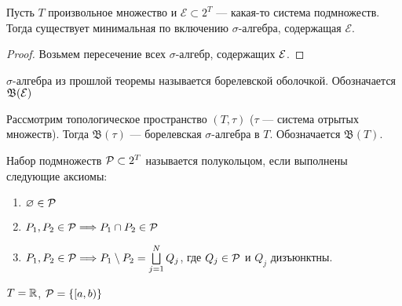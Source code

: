 \begin{thm}
	Пусть $ T$ произвольное множество и $ \mathcal{E} \subset 2^{T}$ --- какая-то система подмножеств. Тогда существует минимальная по включению $ \sigma $-алгебра, содержащая $ \mathcal{E}$.
\end{thm}
\begin{proof}
    Возьмем пересечение всех $\sigma$-алгебр, содержащих $\E$.
\end{proof}

\begin{defn}
	$\sigma$-алгебра из прошлой теоремы называется {\sf борелевской оболочкой}.  
		Обозначается $ \mathfrak{B}(\E)$
\end{defn}
\begin{defn}
	Рассмотрим топологическое пространство $ (T, \tau )$ ($ \tau $ --- система отрытых множеств). Тогда $ \mathfrak{B}(\tau )$ --- {\sf борелевская}  $\sigma$-алгебра в $ T$. Обозначается $ \mathfrak{B}(T)$.
\end{defn}

\begin{defn}[Полукольцо]
    Набор подмножеств $ \P \subset 2^{T}$ называется {\sf полукольцом}, если выполнены следующие аксиомы:
\begin{enumerate}[label=(\roman*),noitemsep]
    \item  $ \varnothing \in \P$
	\item $ P_1, P_2 \in \P \Longrightarrow  P_1 \cap P_2 \in \P$

	\item $ P_1, P_2 \in \P \Longrightarrow P_1 \setminus P_2 = \bigsqcup\limits_{j=1}^{N} Q_{j} $, где $ Q_j \in \P$ и $ Q_j$ дизъюнктны.
\end{enumerate} 
\end{defn}

\begin{ex}
	$ T= \R$, $ \P = \{[a, b)\}$
\end{ex}

